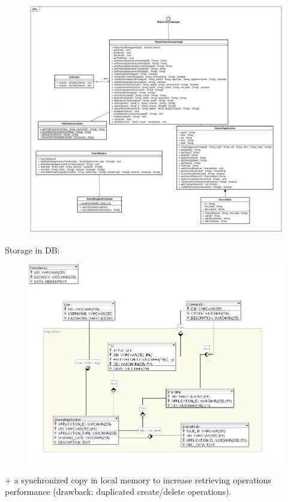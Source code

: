 \begin{frame}
	    
	\begin{figure}
	 	\includegraphics[scale=0.18]{img/RepositoryManagerClassDiagram.png}
	\end{figure}

\end{frame}


\begin{frame}
	
	Storage in DB:
	
	\begin{figure}
	 	\includegraphics[scale=0.18]{img/RepositoryManagerDBModel.png}
	\end{figure}

	+ a synchronized copy in local memory to increase retrieving operations
	performance (drawback: duplicated create/delete operations).

\end{frame}




